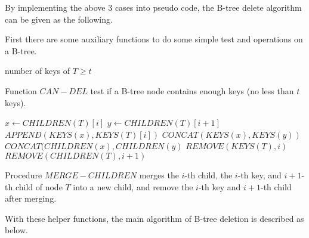 \documentclass{article}
\begin{document}
By implementing the above 3 cases into pseudo code, the B-tree delete algorithm
can be given as the following.

First there are some auxiliary functions to do some simple test and operations
on a B-tree.

\begin{algorithmic}[1]
  \State \Return number of keys of  $T \ge t$
\EndFunction
\end{algorithmic}

Function $CAN-DEL$ test if a B-tree node contains enough keys (no less than
$t$ keys).

\begin{algorithmic}[1]
 
  \State $x \leftarrow CHILDREN(T)[i]$
  \State $y \leftarrow CHILDREN(T)[i+1]$
  \State $APPEND(KEYS(x), KEYS(T)[i])$
  \State $CONCAT(KEYS(x), KEYS(y))$
  \State $CONCAT(CHILDREN(x), CHILDREN(y)$
  \State $REMOVE(KEYS(T), i)$
  \State $REMOVE(CHILDREN(T), i+1)$
\EndProcedure
\end{algorithmic}

Procedure $MERGE-CHILDREN$ merges the $i$-th child, the $i$-th key,
and $i+1$-th child of node $T$ into a new child, and remove the
$i$-th key and $i+1$-th child after merging.

With these helper functions, the main algorithm of B-tree deletion is described
as below.
\end{document}
